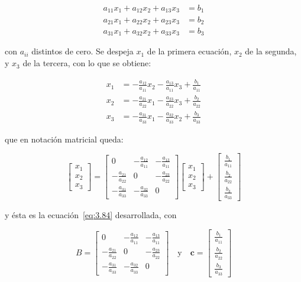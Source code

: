 \documentclass[12pt,letterpaper]{article}
\theoremstyle{definition}
\theoremstyle{plain}
\theoremstyle{remark}
\begin{document}
\[
\begin{aligned}
a_{11}x_1 + a_{12}x_2 + a_{13}x_3 &= b_1 \\
a_{21}x_1 + a_{22}x_2 + a_{23}x_3 &= b_2 \\
a_{31}x_1 + a_{32}x_2 + a_{33}x_3 &= b_3
\end{aligned}
\]

con $a_{ii}$ distintos de cero. Se despeja $x_1$ de la primera ecuación, $x_2$ de la segunda, y $x_3$ de la tercera, con lo que se obtiene:

\begin{equation}
\begin{aligned}
x_1 &= -\frac{a_{12}}{a_{11}}x_2 - \frac{a_{13}}{a_{11}}x_3 + \frac{b_1}{a_{11}} \\
x_2 &= -\frac{a_{21}}{a_{22}}x_1 - \frac{a_{23}}{a_{22}}x_3 + \frac{b_2}{a_{22}} \\
x_3 &= -\frac{a_{31}}{a_{33}}x_1 - \frac{a_{32}}{a_{33}}x_2 + \frac{b_3}{a_{33}}
\end{aligned}
\label{eq:3.86}
\tag{6}
\end{equation}

que en notación matricial queda:

\begin{equation}
\begin{bmatrix}
x_1 \\
x_2 \\
x_3
\end{bmatrix}
=
\begin{bmatrix}
0 & -\frac{a_{12}}{a_{11}} & -\frac{a_{13}}{a_{11}} \\
-\frac{a_{21}}{a_{22}} & 0 & -\frac{a_{23}}{a_{22}} \\
-\frac{a_{31}}{a_{33}} & -\frac{a_{32}}{a_{33}} & 0
\end{bmatrix}
\begin{bmatrix}
x_1 \\
x_2 \\
x_3
\end{bmatrix}
+
\begin{bmatrix}
\frac{b_1}{a_{11}} \\
\frac{b_2}{a_{22}} \\
\frac{b_3}{a_{33}}
\end{bmatrix}
\label{eq:3.87}
\tag{7}
\end{equation}

y ésta es la ecuación~\eqref{eq:3.84} desarrollada, con

\[
B = 
\begin{bmatrix}
0 & -\frac{a_{12}}{a_{11}} & -\frac{a_{13}}{a_{11}} \\
-\frac{a_{21}}{a_{22}} & 0 & -\frac{a_{23}}{a_{22}} \\
-\frac{a_{31}}{a_{33}} & -\frac{a_{32}}{a_{33}} & 0
\end{bmatrix}
\quad \text{y} \quad
\mathbf{c} = 
\begin{bmatrix}
\frac{b_1}{a_{11}} \\
\frac{b_2}{a_{22}} \\
\frac{b_3}{a_{33}}
\end{bmatrix}
\]
\end{document}
